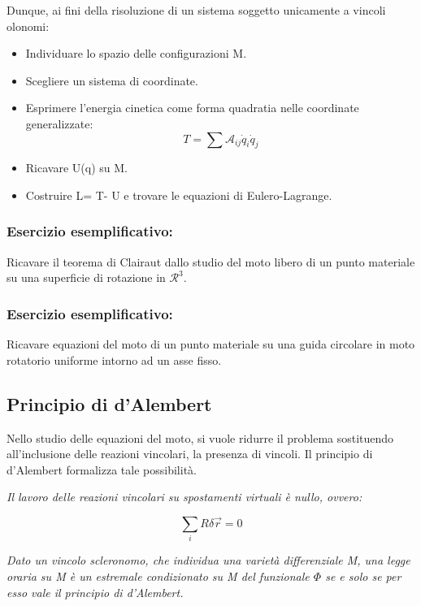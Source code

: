 \documentclass{article}
\begin{document}
Dunque, ai fini della risoluzione di un sistema soggetto unicamente a vincoli olonomi:

\begin{itemize}
    \item Individuare lo spazio delle configurazioni M.
    \item Scegliere un sistema di coordinate.
    \item Esprimere l'energia cinetica come forma quadratia nelle coordinate generalizzate:
    \begin{equation}
        T= \sum \mathcal{A}_{ij} \dot q_i \dot q_j
    \end{equation}
    \item Ricavare U(q) su M.
    \item Costruire L= T- U e trovare le equazioni di Eulero-Lagrange.
\end{itemize}

\subsubsection{Esercizio esemplificativo:}
Ricavare il teorema di Clairaut dallo studio del moto libero di un punto materiale su una superficie di rotazione in $\mathcal{R}^3$.

\subsubsection{Esercizio esemplificativo:}
Ricavare equazioni del moto di un punto materiale su una guida circolare in moto rotatorio uniforme intorno ad un asse fisso.

\subsection{Principio di d'Alembert}
Nello studio delle equazioni del moto, si vuole ridurre il problema sostituendo all'inclusione delle reazioni vincolari, la presenza di vincoli. Il principio di d'Alembert formalizza tale possibilità.

\textit{Il lavoro delle reazioni vincolari su spostamenti virtuali è nullo, ovvero:}

\begin{equation}
    \sum_i R \delta \vec{r}=0
\end{equation}

\textit{Dato un vincolo scleronomo, che individua una varietà differenziale M, una legge oraria su M è un estremale condizionato su M del funzionale $\Phi$ se e solo se per esso vale il principio di d'Alembert.}
\end{document}
